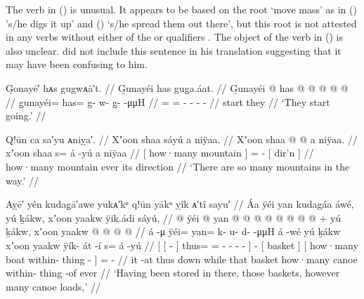 The verb  in (\lastx) is unusual.
It appears to be based on the root  ‘move mass’ as in  () ’s/he digs it up’ and  () ‘s/he spread them out there’, but this root is not attested in any verbs without either of the  or  qualifiers \parencite[29–25]{leer:1976}.
The object of the verb in (\lastx) is also unclear.
\citeauthor{swanton:1909} did not include this sentence in his translation suggesting that it may have been confusing to him.

\ex\label{ex:92-159-started-going}%
%
\begingl
	\glpreamble	G̣onayē′ hᴀs gugwᴀā′t. //
	\glpreamble	G̱unayéi has gug̱a.áat. //
	\gla	G̱unayéi @ has @  @ {} @ {} @ {} @ {}  //
	\glb	g̱unayéi= has= g- w- g̱-  -μμH //
	\glc	{}= = - - -  - //
	\gld	start they  {} {} {} {} //
	\glft	‘They start going.’
		//
\endgl
\xe

\ex\label{ex:92-160-many-mountains-direction}%
%
\begingl
	\glpreamble	Q!ūn ca sa′yu ᴀniỵa′. //
	\glpreamble	Xʼoon shaa sáyú a niÿaa. //
	\gla	{} Xʼoon shaa {}  @ {} @ {}
		{} a niÿaa. {} //
	\glb	{} xʼoon shaa {} s= á -yú
		{} a niÿaa {}  //
	\glc	{}[ how·many mountain {}] =  -
		{}[  dir’n {}] //
	\gld	{} how·many mountain {} ever\·  {}
		{} its direction {} //
	\glft	‘There are so many mountains in the way.’
		//
\endgl
\xe

\ex\label{ex:92-161-stored-baskets-canoeloads}%
%
\begingl
	\glpreamble	Aỵē′ yên kudag̣ā′awe yukᴀ′kᵘ q!ūn yākᵘ ỵîk ᴀ′tî sayu′ //
	\glpreamble	Áa ÿéi yan kudagáa áwé, yú ḵákw, xʼoon yaakw ÿik.ádi sáyú, //
	\gla	{} {}  @ {} {}
			ÿéi @ yan @  @ {} @ {} @ {} @ {} @ {} @ {} {}
		 @ {} +
		{} yú ḵákw, {}
		{} xʼoon yaakw  @ {} @ {} {}
		 @ {} @ {} //
	\glb	{} {} á -μ {} ÿéi= yan= k- u- {} d-  -μμH {} {}
		á -wé
		{} yú ḵákw {}
		{} xʼoon yaakw ÿík- át -í {}
		s= á -yú //
	\glc	{}[ {}[  - {}]
			thus= = - - \· -
				 - \· {}]
		 -
		{}[  basket {}]
		{}[ how·many boat within- thing - {}]
		=  - //
	\gld	{} {} it -at {} thus down
			 {} {} {} {} {} while {}
		 {}
		{} that basket {}
		{} how·many canoe within- thing -of {}
		ever\·  {} //
	\glft	‘Having been stored in there, those baskets, however many canoe loads,’
		//
\endgl
\xe

